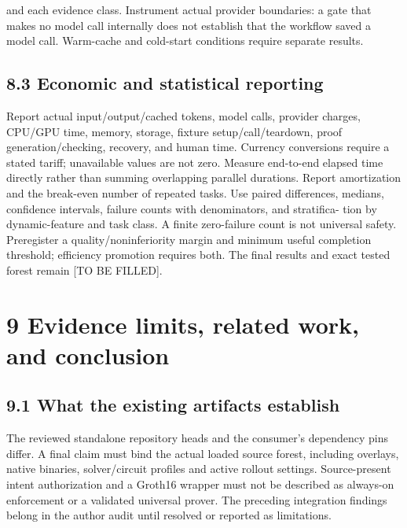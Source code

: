 \documentclass{article}
\begin{document}
and each evidence class. Instrument actual provider boundaries: a gate that makes no model call
internally does not establish that the workflow saved a model call. Warm-cache and cold-start
conditions require separate results.



\subsection*{8.3 Economic and statistical reporting}

Report actual input/output/cached tokens, model calls, provider charges, CPU/GPU time, memory,
storage, fixture setup/call/teardown, proof generation/checking, recovery, and human time. Currency
conversions require a stated tariff; unavailable values are not zero. Measure end-to-end elapsed time
directly rather than summing overlapping parallel durations. Report amortization and the break-even
number of repeated tasks.
Use paired differences, medians, confidence intervals, failure counts with denominators, and stratifica-
tion by dynamic-feature and task class. A finite zero-failure count is not universal safety. Preregister
a quality/noninferiority margin and minimum useful completion threshold; efficiency promotion
requires both. The final results and exact tested forest remain [TO BE FILLED].


\section*{9 Evidence limits, related work, and conclusion}
\subsection*{9.1 What the existing artifacts establish}

The reviewed standalone repository heads and the consumer’s dependency pins differ. A final claim
must bind the actual loaded source forest, including overlays, native binaries, solver/circuit profiles
and active rollout settings. Source-present intent authorization and a Groth16 wrapper must not
be described as always-on enforcement or a validated universal prover. The preceding integration
findings belong in the author audit until resolved or reported as limitations.
\end{document}
